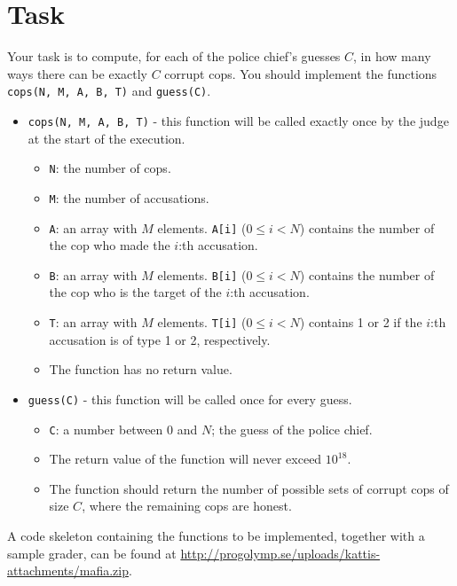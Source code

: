 \section*{Task}
Your task is to compute, for each of the police chief's guesses $C$, in how many ways there can be exactly $C$ corrupt cops.
You should implement the functions \texttt{cops(N, M, A, B, T)} and \texttt{guess(C)}.
\begin{itemize}
  \item \texttt{cops(N, M, A, B, T)} - this function will be called exactly once by the judge at the start of the execution.
  \begin{itemize}
    \item \texttt{N}: the number of cops.
    \item \texttt{M}: the number of accusations.
    \item \texttt{A}: an array with $M$ elements. \texttt{A[i]} ($0 \le i < N$) contains the number of the cop who made the $i$:th accusation.
    \item \texttt{B}: an array with $M$ elements. \texttt{B[i]} ($0 \le i < N$) contains the number of the cop who is the target of the $i$:th accusation.
    \item \texttt{T}: an array with $M$ elements. \texttt{T[i]} ($0 \le i < N$) contains 1 or 2 if the $i$:th accusation is of type 1 or 2, respectively.
		\item The function has no return value.
  \end{itemize}
\end{itemize}

\begin{itemize}
  \item \texttt{guess(C)} - this function will be called once for every guess.
  \begin{itemize}
    \item \texttt{C}: a number between $0$ and $N$; the guess of the police chief.
    \item The return value of the function will never exceed $10^{18}$.
		\item The function should return the number of possible sets of corrupt cops of size $C$, where the remaining cops are honest.
  \end{itemize}
\end{itemize}

A code skeleton containing the functions to be implemented, together with a sample grader, can be found at
\url{http://progolymp.se/uploads/kattis-attachments/mafia.zip}.

